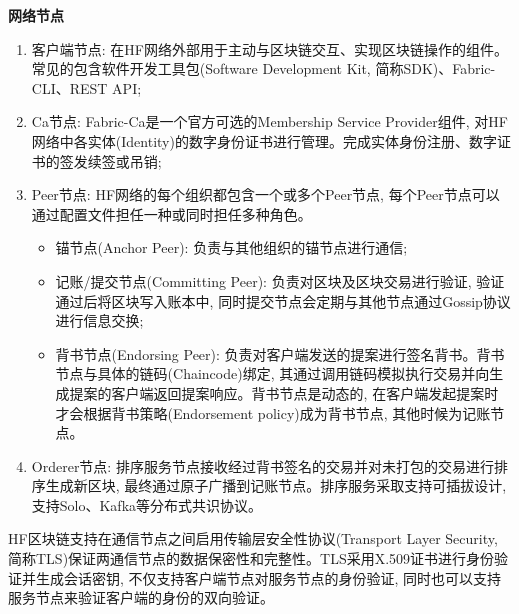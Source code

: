 \textbf{网络节点}
\begin{enumerate}[fullwidth,itemindent=2em,label=(\arabic*)]
    \item 客户端节点: 在HF网络外部用于主动与区块链交互、实现区块链操作的组件。常见的包含软件开发工具包(Software Development Kit, 简称SDK)\footnotemark[2]、Fabric-CLI\footnotemark[3]、REST API\footnotemark[4];

    \item Ca节点: Fabric-Ca\footnotemark[5]是一个官方可选的Membership Service Provider组件, 对HF网络中各实体(Identity)的数字身份证书进行管理。完成实体身份注册、数字证书的签发续签或吊销;

    \item Peer节点: HF网络的每个组织都包含一个或多个Peer节点, 每个Peer节点可以通过配置文件担任一种或同时担任多种角色。

    \begin{itemize}[itemindent=2em]
        \item 锚节点(Anchor Peer): 负责与其他组织的锚节点进行通信;

        \item 记账/提交节点(Committing Peer): 负责对区块及区块交易进行验证, 验证通过后将区块写入账本中, 同时提交节点会定期与其他节点通过Gossip协议进行信息交换;

        \item 背书节点(Endorsing Peer): 负责对客户端发送的提案进行签名背书。背书节点与具体的链码(Chaincode)绑定, 其通过调用链码模拟执行交易并向生成提案的客户端返回提案响应。背书节点是动态的, 在客户端发起提案时才会根据背书策略(Endorsement policy)成为背书节点, 其他时候为记账节点。
    \end{itemize}

    \item Orderer节点: 排序服务节点接收经过背书签名的交易并对未打包的交易进行排序生成新区块, 最终通过原子广播到记账节点。排序服务采取支持可插拔设计, 支持Solo、Kafka等分布式共识协议。

\end{enumerate}

HF区块链支持在通信节点之间启用传输层安全性协议(Transport Layer Security, 简称TLS)保证两通信节点的数据保密性和完整性。TLS采用X.509证书进行身份验证并生成会话密钥, 不仅支持客户端节点对服务节点的身份验证, 同时也可以支持服务节点来验证客户端的身份的双向验证。


